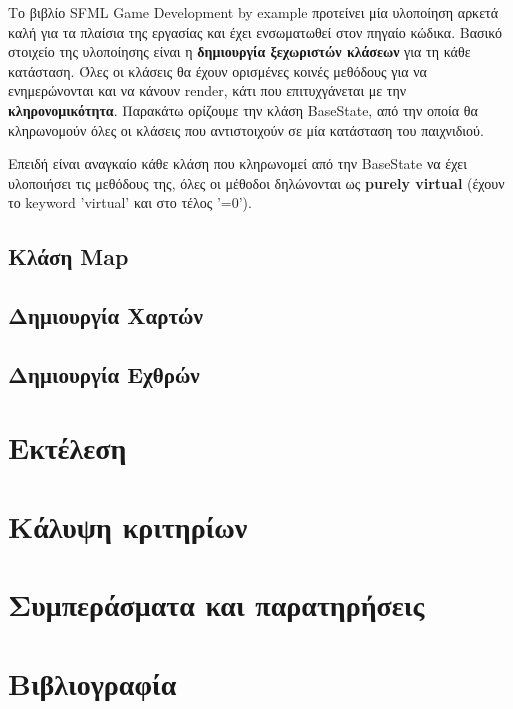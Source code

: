 \documentclass[12pt]{article}
\begin{document}
	Το βιβλίο SFML Game Development by example προτείνει μία υλοποίηση αρκετά καλή για τα πλαίσια της εργασίας και έχει ενσωματωθεί στον πηγαίο κώδικα. Βασικό στοιχείο της υλοποίησης είναι η \textbf{δημιουργία ξεχωριστών κλάσεων} για τη κάθε κατάσταση. Όλες οι κλάσεις θα έχουν ορισμένες κοινές μεθόδους για να ενημερώνονται και να κάνουν render, κάτι που επιτυχγάνεται με την \textbf{κληρονομικότητα}. Παρακάτω ορίζουμε την κλάση BaseState, από την οποία θα κληρωνομούν όλες οι κλάσεις που αντιστοιχούν σε μία κατάσταση του παιχνιδιού.
	
	
	Επειδή είναι αναγκαίο κάθε κλάση που κληρωνομεί από την BaseState να έχει υλοποιήσει τις μεθόδους της, όλες οι μέθοδοι δηλώνονται ως \textbf{purely virtual} (έχουν το keyword 'virtual' και στο τέλος '=0').
	
	\subsection{Κλάση Map}
	
	\subsection{Δημιουργία Χαρτών}
	
	\subsection{Δημιουργία Εχθρών}
	
	\section{Εκτέλεση}
	
	\section{Κάλυψη κριτηρίων}
	
	\section{Συμπεράσματα και παρατηρήσεις}
	
	\section{Βιβλιογραφία}

	
	
	
\end{document}
